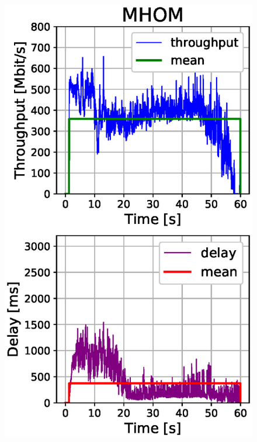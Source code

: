 \documentclass[conference,10pt]{IEEEtran}
\begin{document}
\begin{enumerate}
\begin{figure}[!t]
\begin{minipage}{.245\textwidth}
		\includegraphics[width=\linewidth, keepaspectratio]{images/results_mho_mean.eps}
		\label{fig:test3}
	\end{minipage}
	\begin{minipage}{.245\textwidth}
		\centering

\end{minipage}
\end{figure}
\end{enumerate}
\end{document}
